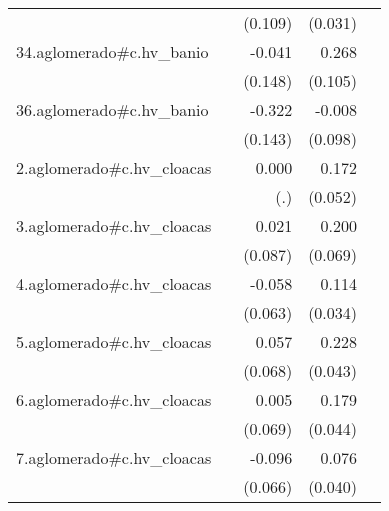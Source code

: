 {\begin{longtable}{l*{4}{D{.}{.}{-1}}}
            &                     &     (0.109)         &     (0.031)         &                     \\
\addlinespace
34.aglomerado#c.hv\_banio&                     &      -0.041         &       0.268\sym{*}  &                     \\
            &                     &     (0.148)         &     (0.105)         &                     \\
\addlinespace
36.aglomerado#c.hv\_banio&                     &      -0.322\sym{*}  &      -0.008         &                     \\
            &                     &     (0.143)         &     (0.098)         &                     \\
\addlinespace
2.aglomerado#c.hv\_cloacas&                     &       0.000         &       0.172\sym{**} &                     \\
            &                     &         (.)         &     (0.052)         &                     \\
\addlinespace
3.aglomerado#c.hv\_cloacas&                     &       0.021         &       0.200\sym{**} &                     \\
            &                     &     (0.087)         &     (0.069)         &                     \\
\addlinespace
4.aglomerado#c.hv\_cloacas&                     &      -0.058         &       0.114\sym{***}&                     \\
            &                     &     (0.063)         &     (0.034)         &                     \\
\addlinespace
5.aglomerado#c.hv\_cloacas&                     &       0.057         &       0.228\sym{***}&                     \\
            &                     &     (0.068)         &     (0.043)         &                     \\
\addlinespace
6.aglomerado#c.hv\_cloacas&                     &       0.005         &       0.179\sym{***}&                     \\
            &                     &     (0.069)         &     (0.044)         &                     \\
\addlinespace
7.aglomerado#c.hv\_cloacas&                     &      -0.096         &       0.076         &                     \\
            &                     &     (0.066)         &     (0.040)         &                     \\

\end{longtable}}
